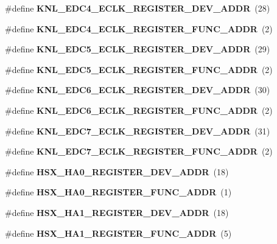 \begin{DoxyCompactItemize}
\mbox{\label{types_8h_a227c3545ab29a804195037ea280a843e}} 
\#define {\bfseries K\+N\+L\+\_\+\+E\+D\+C4\+\_\+\+E\+C\+L\+K\+\_\+\+R\+E\+G\+I\+S\+T\+E\+R\+\_\+\+D\+E\+V\+\_\+\+A\+D\+DR}~(28)
\item 
\mbox{\label{types_8h_ad1911a794934d22cac5944409fd0fbd3}} 
\#define {\bfseries K\+N\+L\+\_\+\+E\+D\+C4\+\_\+\+E\+C\+L\+K\+\_\+\+R\+E\+G\+I\+S\+T\+E\+R\+\_\+\+F\+U\+N\+C\+\_\+\+A\+D\+DR}~(2)
\item 
\mbox{\label{types_8h_a561837bdac684c78c1c6372f005ab507}} 
\#define {\bfseries K\+N\+L\+\_\+\+E\+D\+C5\+\_\+\+E\+C\+L\+K\+\_\+\+R\+E\+G\+I\+S\+T\+E\+R\+\_\+\+D\+E\+V\+\_\+\+A\+D\+DR}~(29)
\item 
\mbox{\label{types_8h_a7f8898a8f0d181b2d5d8c90930461d04}} 
\#define {\bfseries K\+N\+L\+\_\+\+E\+D\+C5\+\_\+\+E\+C\+L\+K\+\_\+\+R\+E\+G\+I\+S\+T\+E\+R\+\_\+\+F\+U\+N\+C\+\_\+\+A\+D\+DR}~(2)
\item 
\mbox{\label{types_8h_a85b20f5ef40abaa301bfe4614ccb5601}} 
\#define {\bfseries K\+N\+L\+\_\+\+E\+D\+C6\+\_\+\+E\+C\+L\+K\+\_\+\+R\+E\+G\+I\+S\+T\+E\+R\+\_\+\+D\+E\+V\+\_\+\+A\+D\+DR}~(30)
\item 
\mbox{\label{types_8h_ae44f8def4d380f6b523065b6ad403607}} 
\#define {\bfseries K\+N\+L\+\_\+\+E\+D\+C6\+\_\+\+E\+C\+L\+K\+\_\+\+R\+E\+G\+I\+S\+T\+E\+R\+\_\+\+F\+U\+N\+C\+\_\+\+A\+D\+DR}~(2)
\item 
\mbox{\label{types_8h_a63835bc909d78cfe67baabb58802e48e}} 
\#define {\bfseries K\+N\+L\+\_\+\+E\+D\+C7\+\_\+\+E\+C\+L\+K\+\_\+\+R\+E\+G\+I\+S\+T\+E\+R\+\_\+\+D\+E\+V\+\_\+\+A\+D\+DR}~(31)
\item 
\mbox{\label{types_8h_aef2dffc363df3054830a8ababcd42e43}} 
\#define {\bfseries K\+N\+L\+\_\+\+E\+D\+C7\+\_\+\+E\+C\+L\+K\+\_\+\+R\+E\+G\+I\+S\+T\+E\+R\+\_\+\+F\+U\+N\+C\+\_\+\+A\+D\+DR}~(2)
\item 
\mbox{\label{types_8h_a34021b3710c643853642ba66e2f4a2c0}} 
\#define {\bfseries H\+S\+X\+\_\+\+H\+A0\+\_\+\+R\+E\+G\+I\+S\+T\+E\+R\+\_\+\+D\+E\+V\+\_\+\+A\+D\+DR}~(18)
\item 
\mbox{\label{types_8h_a93502369d61ea5f77d7bf0f8d6586adf}} 
\#define {\bfseries H\+S\+X\+\_\+\+H\+A0\+\_\+\+R\+E\+G\+I\+S\+T\+E\+R\+\_\+\+F\+U\+N\+C\+\_\+\+A\+D\+DR}~(1)
\item 
\mbox{\label{types_8h_a87139f8006da89c42647350976322cdc}} 
\#define {\bfseries H\+S\+X\+\_\+\+H\+A1\+\_\+\+R\+E\+G\+I\+S\+T\+E\+R\+\_\+\+D\+E\+V\+\_\+\+A\+D\+DR}~(18)
\item 
\mbox{\label{types_8h_a764931262bf3027e32018ef80771a0c4}} 
\#define {\bfseries H\+S\+X\+\_\+\+H\+A1\+\_\+\+R\+E\+G\+I\+S\+T\+E\+R\+\_\+\+F\+U\+N\+C\+\_\+\+A\+D\+DR}~(5)

\end{DoxyCompactItemize}
